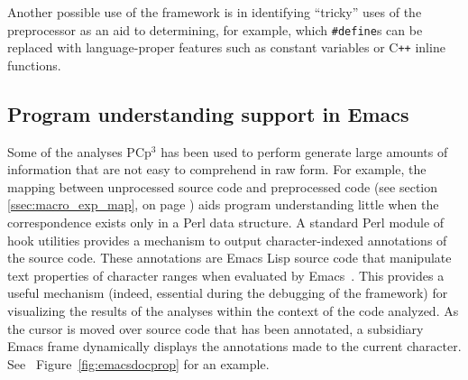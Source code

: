 \documentclass{article}
\newcommand{\pcp}{\mbox{\textsf{PCp}$^3$}}
\newcommand{\CPP}{\mbox{C\texttt{++}}}
\newcommand{\Perl}{\mbox{Perl}}
\newcommand{\ppd}[1]{\texttt{\##1}}
\newcommand{\sectionref}[1]{section \ref{#1}, on page \pageref{#1}}
\newcommand{\figref}[1]{Figure~\ref{#1}}
\begin{document}
Another possible use of the framework is in identifying ``tricky'' uses
of the preprocessor as an aid to determining, for example, which
\ppd{define}s can be replaced with language-proper features such as
constant variables or \CPP{} inline functions.

\subsection{Program understanding support in Emacs}
\label{ssec:prg_und_supp}
Some of the analyses \pcp{} has been used to perform generate large amounts of
information that are not easy to comprehend in raw form.  For example,
the mapping between unprocessed source code and preprocessed code 
(see \sectionref{ssec:macro_exp_map}) aids
program understanding little when the correspondence exists only in a
\Perl{} data structure.
A standard \Perl{} module of hook utilities provides a
mechanism to output character-indexed annotations of the source code.
These annotations are Emacs Lisp source code that manipulate text
properties of character ranges when evaluated by Emacs~\cite{GNUELisp}.  This
provides a useful mechanism (indeed, essential during the debugging of
the framework) for visualizing the results of the analyses within the
context of the code analyzed.  As the cursor is moved over source code
that has been annotated, a subsidiary Emacs frame dynamically displays
the annotations made to the current character. See
~\figref{fig:emacsdocprop} for an example.
\end{document}
